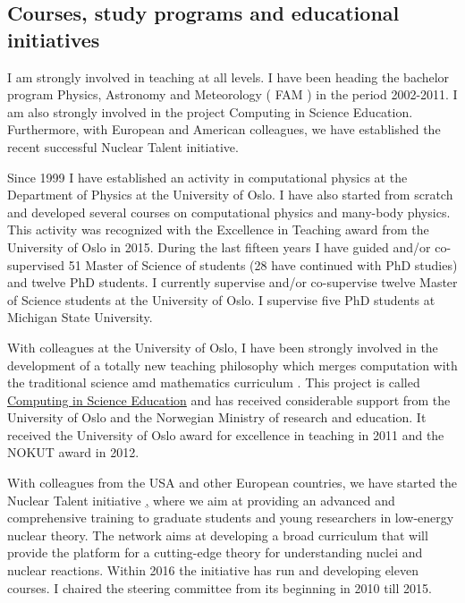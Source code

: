 \documentclass[a4wide,10pt]{article}
\begin{document}
\subsection*{Courses, study programs and educational initiatives}

I am strongly involved in teaching at all levels. I have been heading the bachelor program Physics, Astronomy and Meteorology ( FAM ) in the period 2002-2011. I am also strongly involved in the project Computing in Science Education. Furthermore, with European and American colleagues, we have established the recent successful Nuclear Talent initiative.

Since 1999 I have   established an activity in computational physics  at the  Department of Physics at the University of Oslo. I have also started from scratch and developed several  courses on computational physics and many-body physics. This activity was recognized with the Excellence in Teaching award from the University of Oslo in 2015. During the last fifteen years I have guided and/or co-supervised  51 Master of Science of students (28 have continued with PhD studies) and twelve PhD students.  I currently supervise and/or co-supervise twelve Master of Science students at the University of Oslo. I supervise five PhD students at Michigan State University.

With colleagues at the University of Oslo, I have   been strongly involved in the development of a totally new teaching philosophy which merges computation with the traditional science amd mathematics curriculum . This project is called \href{{http://www.mn.uio.no/english/about/collaboration/cse/}}{Computing in Science Education} and has received considerable support from the University of Oslo and the Norwegian Ministry of research and education.  It received the University of Oslo award for excellence in teaching  in 2011 and the NOKUT award in 2012. 

With colleagues from the USA and other European countries, we have started the Nuclear Talent initiative \href{http://www.nucleartalent.org},  where we aim  at providing an advanced and comprehensive training to graduate students and young researchers in low-energy nuclear theory.  The network aims at developing a broad curriculum that will provide the platform for a cutting-edge theory for understanding nuclei and nuclear reactions.  Within 2016 the initiative has run and developing eleven courses. I chaired the steering committee from its beginning in 2010 till 2015. 
\end{document}
